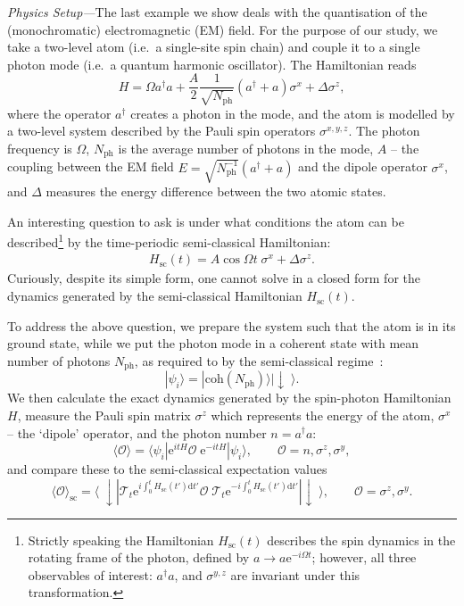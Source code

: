 \documentclass{SciPost}
\newcommand\0{\scalebox{-1}[1]{0}}
\begin{document}
\emph{Physics Setup---}The last example we show deals with the quantisation of the (monochromatic) electromagnetic (EM) field. For the purpose of our study, we take a two-level atom (i.e.~a single-site spin chain) and couple it to a single photon mode (i.e.~a quantum harmonic oscillator). The Hamiltonian reads 
\begin{equation}
\label{eq:JC_H}
H = \Omega a^\dagger a + \frac{A}{2}\frac{1}{\sqrt{N_\mathrm{ph}}}\left(a^\dagger + a\right)\sigma^x + \Delta\sigma^z,
\end{equation}
where the operator $a^\dagger$ creates a photon in the mode, and the atom is modelled by a two-level system described by the Pauli spin operators $\sigma^{x,y,z}$. The photon frequency is $\Omega$, $N_\mathrm{ph}$ is the average number of photons in the mode, $A$ -- the coupling between the EM field $E=\sqrt{N_\mathrm{ph}^{-1}}\left( a^\dagger + a\right)$ and the dipole operator $\sigma^x$, and $\Delta$ measures the energy difference between the two atomic states. 

An interesting question to ask is under what conditions the atom can be described\footnote{Strictly speaking the Hamiltonian $H_\mathrm{sc}(t)$ describes the spin dynamics in the rotating frame of the photon, defined by $a\to a\mathrm e^{-i\Omega t}$; however, all three observables of interest: $a^\dagger a$, and $\sigma^{y,z}$ are invariant under this transformation.} by the time-periodic semi-classical Hamiltonian:
\begin{eqnarray}
H_\mathrm{sc}(t) = A\cos\Omega t\;\sigma^x + \Delta\sigma^z. 
\end{eqnarray}
Curiously, despite its simple form, one cannot solve in a closed form for the dynamics generated by the semi-classical Hamiltonian $H_\mathrm{sc}(t)$. 

To address the above question, we prepare the system such that the atom is in its ground state, while we put the photon mode in a coherent state with mean number of photons $N_\mathrm{ph}$, as required to by the semi-classical regime~\cite{haroche_book}: 
\begin{equation}
|\psi_i\rangle = |\mathrm{coh}(N_\mathrm{ph})\rangle|\downarrow\; \rangle.
\label{eq:psi_i_sp_ph}
\end{equation}
We then calculate the exact dynamics generated by the spin-photon Hamiltonian $H$, measure the Pauli spin matrix $\sigma^z$ which represents the energy of the atom, $\sigma^x$ -- the `dipole' operator, and the photon number $n=a^\dagger a$:
\begin{equation}
\langle \mathcal{O}\rangle = \langle\psi_i|\mathrm e^{itH}\mathcal{O}\;\mathrm e^{-itH}|\psi_i\rangle, \qquad \mathcal{O} = n,\sigma^z,\sigma^y,
\end{equation}
and compare these to the semi-classical expectation values
\begin{equation}
\langle \mathcal{O}\rangle_\mathrm{sc} = \langle\;\downarrow|\mathcal{T}_t \mathrm e^{i\int^t_0 H_\mathrm{sc}(t')\mathrm{d}t'}\mathcal{O}\;\mathcal{T}_t \mathrm e^{-i\int^t_0 H_\mathrm{sc}(t')\mathrm{d}t'}|\downarrow\;\rangle, \qquad \mathcal{O} = \sigma^z,\sigma^y.
\end{equation}
\end{document}
